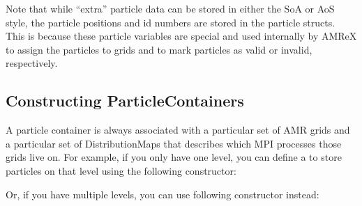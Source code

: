 \documentclass[letterpaper,10pt,english]{sphinxmanual}
\begin{document}
\sphinxAtStartPar
Note that while “extra” particle data can be stored in either the SoA or AoS
style, the particle positions and id numbers are  stored in the
particle structs. This is because these particle variables are special and used
internally by AMReX to assign the particles to grids and to mark particles as
valid or invalid, respectively.


\subsection{Constructing ParticleContainers}
\label{\detokenize{Particle:constructing-particlecontainers}}
\sphinxAtStartPar
A particle container is always associated with a particular set of AMR grids
and a particular set of DistributionMaps that describes which MPI processes
those grids live on.  For example, if you only have one level, you can define a
 to store particles on that level using the following
constructor:

\begin{sphinxVerbatim}[commandchars=\\\{\}]
               
                      
                                 
\end{sphinxVerbatim}

\sphinxAtStartPar
Or, if you have multiple levels, you can use following constructor instead:

\begin{sphinxVerbatim}[commandchars=\\\{\}]
               
                      
                                 
                                      
\end{sphinxVerbatim}
\end{document}
